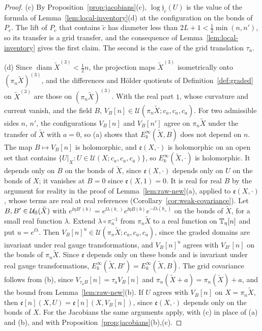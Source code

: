 \begin{proof}
(c) By Proposition~\ref{prop:jacobians}(c), $\log\mathfrak j_c(U)$ is the value of the formula of Lemma~\ref{lem:local-inventory}(d) at the configuration on the bonds of $P_c$. The lift of $P_c$ that contains $\tilde c$ has diameter less than $2L+1<\frac12\min(n,n')$, so its transfer is a grid transfer, and the consequence of Lemma~\ref{lem:local-inventory} gives the first claim. The second is the case of the grid translation $\tau_a$.

(d) Since $\operatorname{diam}\tilde X^{(3)}<\frac12n$, the projection maps $\tilde X^{(3)}$ isometrically onto $(\pi_n\tilde X)^{(3)}$, and the differences and H\"older quotients of Definition~\ref{def:graded} on $\tilde X^{(3)}$ are those on $(\pi_n\tilde X)^{(3)}$. With the real part $1$, whose curvature and current vanish, and the field $B$, $V_B[n]\in\mathcal U(\pi_n\tilde X;c_a,c_a,c_a)$. For two admissible sides $n$, $n'$, the configurations $V_B[n]$ and $V_B[n']$ agree on $\pi_n\tilde X$ under the transfer of $\tilde X$ with $a=0$, so (a) shows that $E^\infty_k(\tilde X,B)$ does not depend on $n$. The map $B\mapsto V_B[n]$ is holomorphic, and $\mathfrak e(X,\cdot)$ is holomorphic on an open set that contains $\{U|_X:U\in\mathcal U(X;c_a,c_a,c_a)\}$, so $E^\infty_k(\tilde X,\cdot)$ is holomorphic. It depends only on $B$ on the bonds of $\tilde X$, since $\mathfrak e(X,\cdot)$ depends only on $U$ on the bonds of $X$; it vanishes at $B=0$ since $\mathfrak e(X,1)=0$. It is real for real $B$ by the argument for reality in the proof of Lemma~\ref{lem:raw-new}(a), applied to $\mathfrak e(X,\cdot)$, whose terms are real at real references (Corollary~\ref{cor:weak-covariance}). Let $B,B'\in\mathcal U_{\rm fl}(\tilde X)$ with $e^{\ii\eta B'(b)}=e^{\ii\lambda(b_-)}e^{\ii\eta B(b)}e^{-\ii\lambda(b_+)}$ on the bonds of $\tilde X$, for a small real function $\lambda$. Extend $\lambda\circ\pi_n^{-1}$ from $\pi_n\tilde X$ to a real function on $\mathbb T_\eta[n]$ and put $u=e^{\ii\lambda}$. Then $V_B[n]^u\in\mathcal U(\pi_n\tilde X;c_a,c_a,c_a)$, since the graded domains are invariant under real gauge transformations, and $V_B[n]^u$ agrees with $V_{B'}[n]$ on the bonds of $\pi_n\tilde X$. Since $\mathfrak e$ depends only on these bonds and is invariant under real gauge transformations, $E^\infty_k(\tilde X,B')=E^\infty_k(\tilde X,B)$. The grid covariance follows from (b), since $V_{\tau_aB}[n]=\tau_aV_B[n]$ and $\pi_n(\tilde X+a)=\pi_n(\tilde X)+a$, and the bound from Lemma~\ref{lem:raw-new}(b). If $U$ agrees with $V_B[n]$ on $X=\pi_n\tilde X$, then $\mathfrak e[n](X,U)=\mathfrak e[n](X,V_B[n])$, since $\mathfrak e(X,\cdot)$ depends only on the bonds of $X$. For the Jacobians the same arguments apply, with (c) in place of (a) and (b), and with Proposition~\ref{prop:jacobians}(b),(c).
\end{proof}

